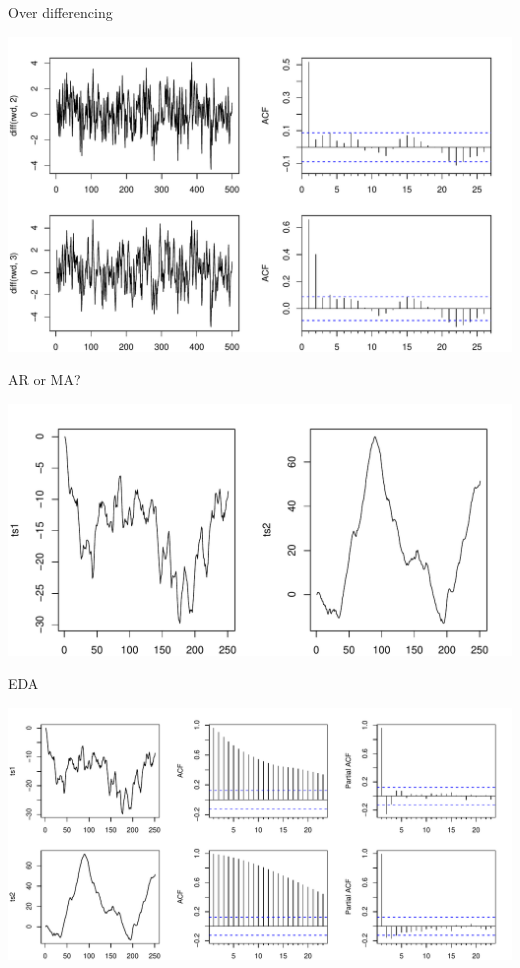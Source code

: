 \documentclass[11pt,ignorenonframetext,]{beamer}
\begin{document}
\begin{frame}{Over differencing}

\includegraphics{Lec9_files/figure-beamer/unnamed-chunk-3-1.pdf}

\end{frame}

\begin{frame}{AR or MA?}

\includegraphics{Lec9_files/figure-beamer/unnamed-chunk-4-1.pdf}

\end{frame}

\begin{frame}{EDA}

\includegraphics{Lec9_files/figure-beamer/unnamed-chunk-5-1.pdf}

\end{frame}
\end{document}
